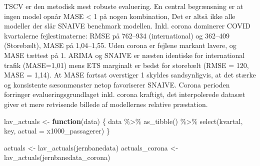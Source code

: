 \documentclass[
  danish,
]{article}
\newenvironment{Shaded}{\begin{snugshade}}{\end{snugshade}}
\newcommand{\AttributeTok}[1]{\textcolor[rgb]{0.40,0.45,0.13}{#1}}
\newcommand{\ControlFlowTok}[1]{\textcolor[rgb]{0.00,0.23,0.31}{\textbf{#1}}}
\newcommand{\FunctionTok}[1]{\textcolor[rgb]{0.28,0.35,0.67}{#1}}
\newcommand{\NormalTok}[1]{\textcolor[rgb]{0.00,0.23,0.31}{#1}}
\newcommand{\OtherTok}[1]{\textcolor[rgb]{0.00,0.23,0.31}{#1}}
\newcommand{\SpecialCharTok}[1]{\textcolor[rgb]{0.37,0.37,0.37}{#1}}
\begin{document}
TSCV er den metodisk mest robuste evaluering. En central begrænsning er
at ingen model opnår MASE \textless{} 1 på nogen kombination, Det er
altså ikke alle modeller der slår SNAIVE benchmark modellen. Inkl.
corona dominerer COVID kvartalerne fejlestimaterne: RMSE på 762--934
(international) og 362--409 (Storebælt), MASE på 1,04--1,55. Uden corona
er fejlene markant lavere, og MASE tættest på 1. ARIMA og SNAIVE er
næsten identiske for international trafik (MASE=1,01) mens ETS marginalt
er bedst for storebælt (RMSE = 120, MASE = 1,14). At MASE fortsat
overstiger 1 skyldes sandsynligvis, at det stærke og konsistente
sæsonmønster netop favoriserer SNAIVE. Corona perioden forringer
evalueringsgrundlaget inkl. corona kraftigt, det interpolerede datasæt
giver et mere retvisende billede af modellernes relative præstation.

\begin{Shaded}
\begin{Highlighting}[]
\NormalTok{lav\_actuals }\OtherTok{\textless{}{-}} \ControlFlowTok{function}\NormalTok{(data) \{}
\NormalTok{  data }\SpecialCharTok{\%\textgreater{}\%}
    \FunctionTok{as\_tibble}\NormalTok{() }\SpecialCharTok{\%\textgreater{}\%}
    \FunctionTok{select}\NormalTok{(kvartal, key, }\AttributeTok{actual =}\NormalTok{ x1000\_passagerer)}
\NormalTok{\}}

\NormalTok{actuals        }\OtherTok{\textless{}{-}} \FunctionTok{lav\_actuals}\NormalTok{(jernbanedata)}
\NormalTok{actuals\_corona }\OtherTok{\textless{}{-}} \FunctionTok{lav\_actuals}\NormalTok{(jernbanedata\_corona)}
\end{Highlighting}
\end{Shaded}
\end{document}

